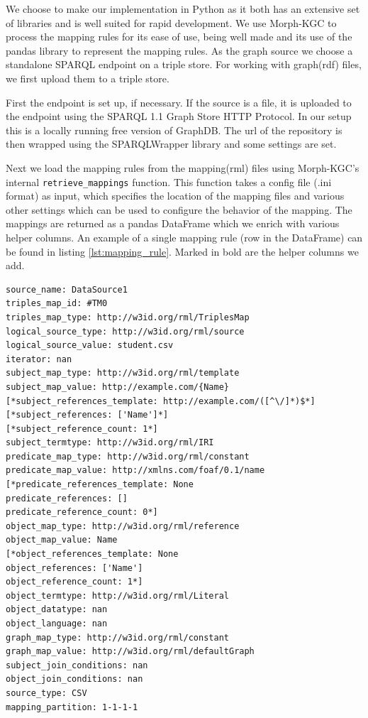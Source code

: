 We choose to make our implementation in Python as it both has an extensive set of libraries and is well suited for rapid development. We use Morph-KGC to process the mapping rules for its ease of use, being well made and its use of the pandas library to represent the mapping rules. As the graph source we choose a standalone SPARQL endpoint on a triple store. For working with graph(\acrshort{rdf}) files, we first upload them to a triple store.

First the endpoint is set up, if necessary. If the source is a file, it is uploaded to the endpoint using the SPARQL 1.1 Graph Store HTTP Protocol. In our setup this is a locally running free version of GraphDB. The url of the repository is then wrapped using the SPARQLWrapper library and some settings are set.

Next we load the mapping rules from the mapping(\acrshort{rml}) files using Morph-KGC's internal \texttt{retrieve\_mappings} function. This function takes a config file (.ini format) as input, which specifies the location of the mapping files and various other settings which can be used to configure the behavior of the mapping. The mappings are returned as a pandas DataFrame which we enrich with various helper columns. An example of a single mapping rule (row in the DataFrame) can be found in listing \ref{lst:mapping_rule}. Marked in bold are the helper columns we add.

\begin{lstlisting}[caption={Example of a mapping rule in Morph-KGC}, label={lst:mapping_rule}, captionpos=b, basicstyle=\small, float=!ht, frame=single]
source_name: DataSource1
triples_map_id: #TM0
triples_map_type: http://w3id.org/rml/TriplesMap
logical_source_type: http://w3id.org/rml/source
logical_source_value: student.csv
iterator: nan
subject_map_type: http://w3id.org/rml/template
subject_map_value: http://example.com/{Name}
[*subject_references_template: http://example.com/([^\/]*)$*]
[*subject_references: ['Name']*]
[*subject_reference_count: 1*]
subject_termtype: http://w3id.org/rml/IRI
predicate_map_type: http://w3id.org/rml/constant
predicate_map_value: http://xmlns.com/foaf/0.1/name
[*predicate_references_template: None
predicate_references: []
predicate_reference_count: 0*]
object_map_type: http://w3id.org/rml/reference
object_map_value: Name
[*object_references_template: None
object_references: ['Name']
object_reference_count: 1*]
object_termtype: http://w3id.org/rml/Literal
object_datatype: nan
object_language: nan
graph_map_type: http://w3id.org/rml/constant
graph_map_value: http://w3id.org/rml/defaultGraph
subject_join_conditions: nan
object_join_conditions: nan
source_type: CSV
mapping_partition: 1-1-1-1
\end{lstlisting}

